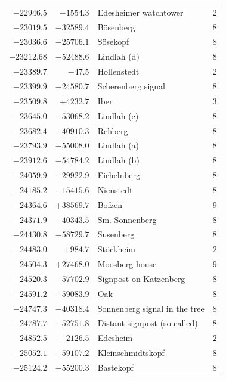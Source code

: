 \begin{center}
\begin{tabular}{r|r|p{170pt}|r}
\(-22946.5\)&\(-1554.3\)&Edesheimer watchtower&\(2\)\\
\(-23019.5\)&\(-32589.4\)&Bösenberg&\(8\)\\
\(-23036.6\)&\(-25706.1\)&Sösekopf&\(8\)\\
\(-23212.68\)&\(-52488.6\)&Lindlah (d)&\(8\)\\
\(-23389.7\)&\(-47.5\)&Hollenstedt&\(2\)\\
\(-23399.9\)&\(-24580.7\)&Scherenberg signal&\(8\)\\
\(-23509.8\)&\(+4232.7\)&Iber&\(3\)\\
\(-23645.0\)&\(-53068.2\)&Lindlah (c)&\(8\)\\
\(-23682.4\)&\(-40910.3\)&Rehberg&\(8\)\\
\(-23793.9\)&\(-55008.0\)&Lindlah (a)&\(8\)\\
\(-23912.6\)&\(-54784.2\)&Lindlah (b)&\(8\)\\
\(-24059.9\)&\(-29922.9\)&Eichelnberg&\(8\)\\
\(-24185.2\)&\(-15415.6\)&Nienstedt&\(8\)\\
\(-24364.6\)&\(+38569.7\)&Bofzen&\(9\)\\
\(-24371.9\)&\(-40343.5\)&Sm. Sonnenberg&\(8\)\\
\(-24430.8\)&\(-58729.7\)&Susenberg&\(8\)\\
\(-24483.0\)&\(+984.7\)&Stöckheim&\(2\)\\
\(-24504.3\)&\(+27468.0\)&Moosberg house&\(9\)\\
\(-24520.3\)&\(-57702.9\)&Signpost on Katzenberg&\(8\)\\
\(-24591.2\)&\(-59083.9\)&Oak&\(8\)\\
\(-24747.3\)&\(-40318.4\)&Sonnenberg signal in the tree&\(8\)\\
\(-24787.7\)&\(-52751.8\)&Distant signpost (so called)&\(8\)\\
\(-24852.5\)&\(-2126.5\)&Edesheim&\(2\)\\
\(-25052.1\)&\(-59107.2\)&Kleinschmidtskopf&\(8\)\\
\(-25124.2\)&\(-55200.3\)&Bastekopf&\(8\)\\
\hline\end{tabular}\endgroup\end{center}
\clearpage
